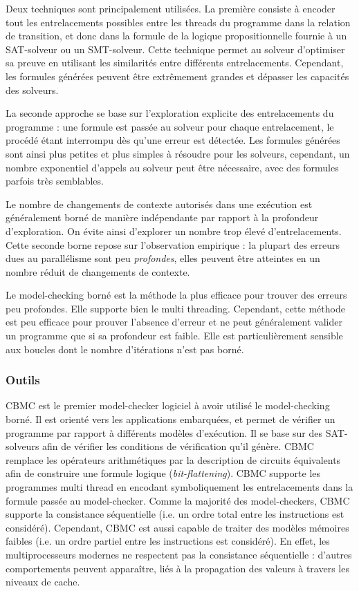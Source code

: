 Deux techniques sont principalement utilisées.
La première consiste à encoder tout les entrelacements possibles entre les threads
du programme dans la relation de transition, et donc dans la formule de la
logique propositionnelle fournie à un SAT-solveur ou un SMT-solveur. Cette
technique permet au solveur d'optimiser sa preuve en utilisant les similarités
entre différents entrelacements. Cependant, les formules générées peuvent être
extrêmement grandes et dépasser les capacités des solveurs.

La seconde approche se base sur l'exploration explicite des entrelacements du
programme : une formule est passée au solveur pour chaque entrelacement, le
procédé étant interrompu dès qu'une erreur est détectée. Les formules générées
sont ainsi plus petites et plus simples à résoudre pour les solveurs, cependant,
un nombre exponentiel d'appels au solveur peut être nécessaire, avec des
formules parfois très semblables.

Le nombre de changements de contexte autorisés dans une exécution est
généralement borné de manière indépendante par rapport à la profondeur
d'exploration. On évite ainsi d'explorer un nombre trop élevé d'entrelacements.
Cette seconde borne repose sur l'observation empirique : la plupart des erreurs
dues au parallélisme sont peu \emph{profondes}, elles peuvent être atteintes en
un nombre réduit de changements de contexte.

Le model-checking borné est la méthode la plus efficace pour trouver des
erreurs peu profondes. Elle supporte bien le multi threading. Cependant,
cette méthode est peu efficace pour prouver l'absence d'erreur et ne
peut généralement valider un programme que si sa profondeur est faible.
Elle est particulièrement sensible aux boucles dont le nombre
d'itérations n'est pas borné.

\subsubsection{Outils}

CBMC\cite{CBMC} est le premier model-checker logiciel à avoir utilisé le
model-checking borné. Il est orienté vers les applications embarquées, et permet
de vérifier un programme par rapport à différents modèles d'exécution. Il se
base sur des SAT-solveurs afin de vérifier les conditions de vérification qu'il
génère. CBMC remplace les opérateurs arithmétiques par la description de
circuits équivalents afin de construire une formule logique
(\emph{bit-flattening}). CBMC supporte les programmes multi thread en encodant
symboliquement les entrelacements dans la formule passée au model-checker. Comme
la majorité des model-checkers, CBMC supporte la consistance séquentielle (i.e.
un ordre total entre les instructions est considéré). Cependant, CBMC est aussi
capable de traiter des modèles mémoires faibles (i.e. un ordre partiel entre les
instructions est considéré). En effet, les multiprocesseurs modernes ne
respectent pas la consistance séquentielle : d'autres comportements peuvent
apparaître, liés à la propagation des valeurs à travers les niveaux de cache.

